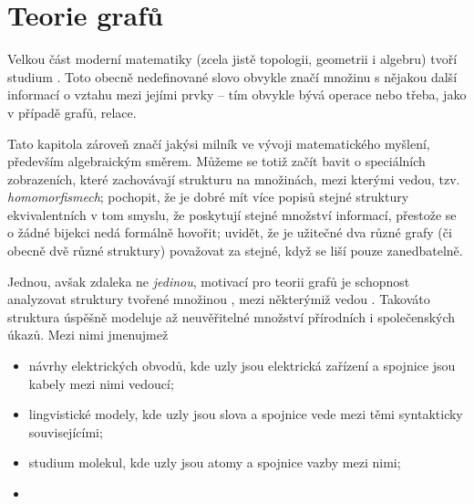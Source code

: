 \section{Teorie grafů}
\label{sec:teorie-grafu}

Velkou část moderní matematiky (zcela jistě topologii, geometrii i algebru)
tvoří studium . Toto obecně nedefinované slovo obvykle značí
množinu s nějakou další informací o vztahu mezi jejími prvky -- tím obvykle bývá
operace nebo třeba, jako v případě grafů, relace.

Tato kapitola zároveň značí jakýsi milník ve vývoji matematického myšlení,
především algebraickým směrem. Můžeme se totiž začít bavit o speciálních
zobrazeních, které zachovávají strukturu na množinách, mezi kterými vedou, tzv.
\emph{homomorfismech}; pochopit, že je dobré mít více popisů stejné struktury
ekvivalentních v tom smyslu, že poskytují stejné množství informací, přestože se
o žádné bijekci nedá formálně hovořit; uvidět, že je užitečné dva různé grafy
(či obecně dvě různé struktury) považovat za stejné, když se liší pouze
zanedbatelně.

Jednou, avšak zdaleka ne \emph{jedinou}, motivací pro teorii grafů je schopnost
analyzovat struktury tvořené množinou , mezi některýmiž vedou
. Takováto struktura úspěšně modeluje až neuvěřitelné množství
přírodních i společenských úkazů. Mezi nimi jmenujmež
\begin{itemize}
 \item návrhy elektrických obvodů, kde uzly jsou elektrická zařízení a spojnice
  jsou kabely mezi nimi vedoucí;
 \item lingvistické modely, kde uzly jsou slova a spojnice vede mezi
  těmi syntakticky souvisejícími;
 \item studium molekul, kde uzly jsou atomy a spojnice vazby mezi nimi;
 \item 
\end{itemize}
